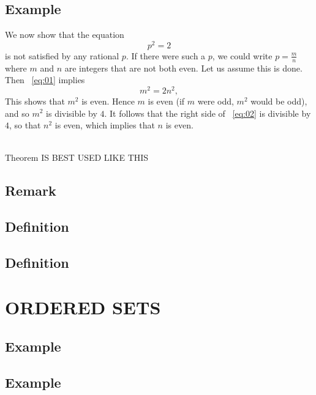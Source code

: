 \subsection*{\textbf{Example}}
\label{subsec:1}
We now show that the equation
\begin{equation}
    \label{eq:01}
    p^2=2
\end{equation}
is not satisfied by any rational $p$. If there were such a $p$, we could write $p=\frac{m}{n}$ where $m$ and $n$ 
are integers that are not both even. Let us assume this is done. Then ~\ref{eq:01} implies
\begin{equation}
    \label{eq:02}
    m^2=2n^2,
\end{equation}
This shows that $m^2$ is even. Hence $m$ is even (if $m$ were odd, $m^2$ would be odd), and so $m^2$ is divisible by $4$.
It follows that the right side of ~\ref{eq:02} is divisible by $4$, so that $n^2$ is even, which implies that $n$ 
is even.\\

~\cite{ARTIN}

\begin{theorem}
Theorem IS BEST USED LIKE THIS
\end{theorem}

\subsection*{\textbf{Remark}}
\label{sec:2}

\subsection*{\textbf{Definition}}
\label{sec:3}

\subsection*{\textbf{Definition}}
\label{sec:4}

\section{ORDERED SETS}







\subsection*{\textbf{Example}}
\label{sec:5}
\subsection*{\textbf{Example}}
\label{sec:6}
